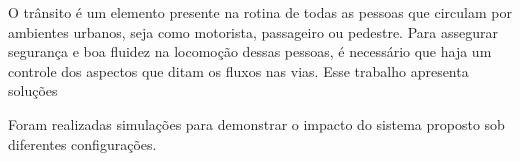 O trânsito é um elemento presente na rotina de todas as pessoas que circulam por ambientes urbanos, seja como motorista, passageiro ou pedestre. Para assegurar segurança e boa fluidez na locomoção dessas pessoas, é necessário que haja um controle dos aspectos que ditam os fluxos nas vias.
Esse trabalho apresenta soluções 

Foram realizadas simulações para demonstrar o impacto do sistema proposto sob diferentes configurações.
